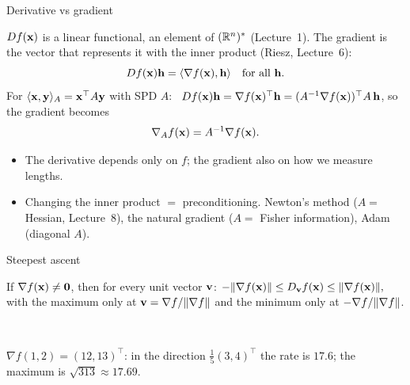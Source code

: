\documentclass[aspectratio=1610,11pt]{beamer}
\begin{document}
\begin{frame}{Derivative vs gradient}
    \begin{remark}
        \small $Df(\mathbf{x})$ is a linear functional, an element of $(\mathbb{R}^n)^*$ (Lecture~1). The gradient is the vector that represents it with the inner product (Riesz, Lecture~6):
        \[Df(\mathbf{x})\mathbf{h} = \langle \nabla f(\mathbf{x}), \mathbf{h} \rangle \quad \text{for all } \mathbf{h}.\]
        For $\langle \mathbf{x}, \mathbf{y} \rangle_A = \mathbf{x}^\top A\mathbf{y}$ with SPD $A$: \ $Df(\mathbf{x})\mathbf{h} = \nabla f(\mathbf{x})^\top\mathbf{h} = (A^{-1}\nabla f(\mathbf{x}))^\top A\,\mathbf{h}$, so the gradient becomes
        \[\nabla_A f(\mathbf{x}) = A^{-1}\nabla f(\mathbf{x}).\]
    \end{remark}
    \small
    \begin{itemize}
        \item The derivative depends only on $f$; the gradient also on how we measure lengths.
        \item Changing the inner product $=$ preconditioning. Newton's method ($A = $ Hessian, Lecture~8), the natural gradient ($A = $ Fisher information), Adam (diagonal $A$).
    \end{itemize}
\end{frame}

\begin{frame}{Steepest ascent}
    \begin{theorem}
        \small If $\nabla f(\mathbf{x}) \neq \mathbf{0}$, then for every unit vector $\mathbf{v}$:
        \(-\lVert \nabla f(\mathbf{x}) \rVert \leq D_{\mathbf{v}}f(\mathbf{x}) \leq \lVert \nabla f(\mathbf{x}) \rVert,\)
        with the maximum only at $\mathbf{v} = \nabla f/\lVert \nabla f \rVert$ and the minimum only at $-\nabla f/\lVert \nabla f \rVert$.
    \end{theorem}
    \centering{}
    \\[0.1em]
    \raggedright\small $\nabla f(1, 2) = (12, 13)^\top$: in the direction $\frac{1}{5}(3, 4)^\top$ the rate is $17.6$; the maximum is $\sqrt{313} \approx 17.69$.
\end{frame}

\end{document}
